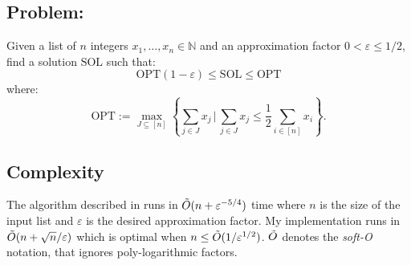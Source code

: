 \subsection{\ApxPartition Problem:}
Given a list of \(n\) integers \(x_1, \ldots, x_n \in \mathbb{N}\) and an approximation factor \(0 < \varepsilon \le 1/2\), find a solution $\text{SOL}$ such that:
\[
    \text{OPT}(1-\varepsilon) \le \text{SOL} \le \text{OPT}
\]
where:
\[
    \text{OPT} := \max_{J \subseteq [n]} \left\{ \sum_{j \in J} x_j \, \bigg| \, \sum_{j \in J} x_j \leq \frac{1}{2} \sum_{i \in [n]} x_i \right\}.
\]



\subsection{Complexity}
The algorithm described in \cite{deng} runs in \(\tilde{O}(n + \varepsilon^{-5/4})\) time where \(n\) is the size of the input list and \(\varepsilon\) is the desired approximation factor. My implementation runs in \(\tilde{O}(n + \sqrt{n}/\varepsilon)\) which is optimal when $n \le \tilde{O}(1/\varepsilon^{1/2})$. $\tilde{O}$ denotes the \textit{soft-O} notation, that ignores poly-logarithmic factors.





